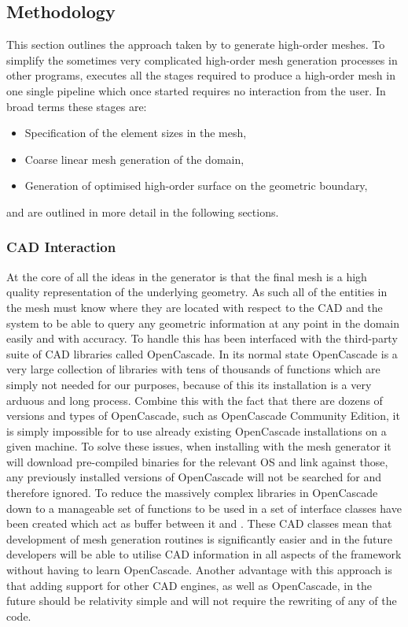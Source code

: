 \subsection{Methodology}

This section outlines the approach taken by \nm to generate high-order meshes.
%
To simplify the sometimes very complicated high-order mesh generation processes
in other programs, \nm executes all the stages required to produce a high-order
mesh in one single pipeline which once started requires no interaction from the
user. In broad terms these stages are:
\begin{itemize}
	\item Specification of the element sizes in the mesh,
	\item Coarse linear mesh generation of the domain,
	\item Generation of optimised high-order surface on the geometric boundary,
\end{itemize}
%
and are outlined in more detail in the following sections.

\subsubsection{CAD Interaction}

At the core of all the ideas in the \nm generator is that the final mesh is a
high quality representation of the underlying geometry. As such all of the
entities in the mesh must know where they are located with respect to the CAD
and the system to be able to query any geometric information at any point in the
domain easily and with accuracy. To handle this \nm has been interfaced with the
third-party suite of CAD libraries called OpenCascade. In its normal state
OpenCascade is a very large collection of libraries with tens of thousands of
functions which are simply not needed for our purposes, because of this its
installation is a very arduous and long process. Combine this with the fact that
there are dozens of versions and types of OpenCascade, such as OpenCascade
Community Edition, it is simply impossible for \nm to use already existing
OpenCascade installations on a given machine. To solve these issues, when
installing \nekpp with the mesh generator it will download pre-compiled binaries
for the relevant OS and link against those, any previously installed versions of
OpenCascade will not be searched for and therefore ignored.
%
To reduce the massively complex libraries in OpenCascade down to a manageable
set of functions to be used in \nm a set of interface classes have been created
which act as buffer between it and \nekpp. These CAD classes mean that
development of mesh generation routines is significantly easier and in the
future \nekpp developers will be able to utilise CAD information in all aspects
of the framework without having to learn OpenCascade. Another advantage with
this approach is that adding support for other CAD engines, as well as
OpenCascade, in the future should be relativity simple and will not require the
rewriting of any of the \nm code.

